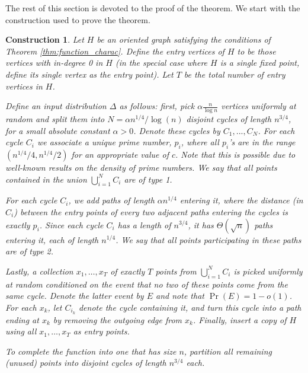 \documentclass[11pt]{article}
\numberwithin{equation}{section}
\newtheorem{construction}[construction]{Construction}
\newcommand{\1}{\mathbf{1}}
\begin{document}
The rest of this section is devoted to the proof of the theorem. 
We start with the construction used to prove the theorem.
\begin{construction}
Let $H$ be an oriented graph satisfying the conditions of Theorem \ref{thm:function_charac}.
 Define the \emph{entry vertices} of $H$ to be those vertices with in-degree 0 in $H$ (in the special case where $H$ is a single fixed point, define its single vertex as the entry point). Let $T$ be the total number of entry vertices in $H$. 
 
 Define an input distribution $\Delta$ as follows: first, pick $\alpha \frac{n}{\log n}$ vertices uniformly at random and split them into $N = \alpha n^{1/4} / \log(n)$ disjoint cycles of length $n^{3/4}$, for a small absolute constant $\alpha > 0$. Denote these cycles by $C_1,...,C_{N}$. For each cycle $C_i$ we associate a unique prime number, $p_i$, where all $p_i$'s are in the range $(n^{1/4}/4, {n^{1/4}}/2)$ for an appropriate value of $c$. Note that this is possible due to well-known results on the density of prime numbers. We say that all points contained in the union $\bigcup_{i=1}^{N} C_i$ are of \emph{type 1}.

For each cycle $C_i$, we add paths of length $\alpha n^{1/4}$ entering it, where the distance (in $C_i$) between the entry points of every two adjacent paths entering the cycles is exactly $p_i$. Since each cycle $C_i$ has a length of $n^{3/4}$, it has $\Theta(\sqrt{n})$ paths entering it, each of length $n^{1/4}$. We say that all points participating in these paths are of \emph{type 2}.

Lastly, a collection $x_1, \ldots, x_T$ of exactly $T$ points from $\bigcup_{i=1}^{N} C_i$ is picked uniformly at random conditioned on the event that no two of these points come from the same cycle. Denote the latter event by $E$ and note that $\Pr(E) = 1-o(1)$. For each $x_k$, let $C_{i_k}$ denote the cycle containing it, and turn this cycle into a path ending at $x_k$ by removing the outgoing edge from $x_k$. Finally, insert a copy of $H$ using all $x_1, \ldots, x_T$ as entry points.

To complete the function into one that has size $n$, partition all remaining (unused) points into disjoint cycles of length $n^{3/4}$ each.
\end{construction}
\end{document}
